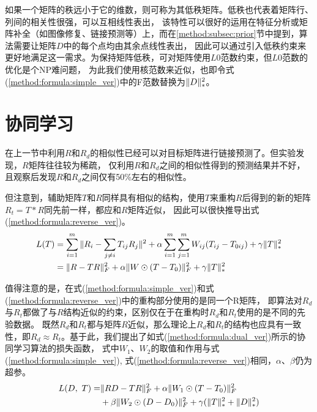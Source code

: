 如果一个矩阵的秩远小于它的维数，则可称为其低秩矩阵。低秩也代表着矩阵行、列间的相关性很强，可以互相线性表出，
该特性可以很好的运用在特征分析或矩阵补全（如图像修复、链接预测等）上，而在\ref{method:subsec:prior}节中提到，算法需要让矩阵$D$中的每个点均由其余点线性表出，
因此可以通过引入低秩约束来更好地满足这一需求。为保持矩阵低秩，可对矩阵使用$L0$范数约束，但$L0$范数的优化是个NP难问题，
为此我们使用核范数来近似，也即令式(\ref{method:formula:simple_ver})中的F范数替换为$\Arrowvert{D}\Arrowvert_*^2$。


\section{协同学习}
\label{method:sec:collaborative}
在上一节中利用$R$和$R_d$的相似性已经可以对目标矩阵进行链接预测了。但实验发现，$R$矩阵往往较为稀疏，
仅利用$R$和$R_d$之间的相似性得到的预测结果并不好，且观察后发现$R$和$R_d$之间仅有50\%左右的相似性。


但注意到，辅助矩阵$T$和$R$同样具有相似的结构，使用$T$来重构$R$后得到的新的矩阵$R_t=T*R$同先前一样，都应和$R$矩阵近似，
因此可以很快推导出式(\ref{method:formula:reverse_ver})。
\begin{align}
L(T)&=\sum_{i=1}^m\Arrowvert{R_i-\sum_{j\neq{i}} T_{ij}R_j }\Arrowvert^2 
+\alpha\sum_{i=1}^m\sum_{j=1}^mW_{ij}(T_{ij}-T_{0ij})+\gamma\Arrowvert{T}\Arrowvert_*^2 \nonumber \\
    &=\Arrowvert{R-TR}\Arrowvert_F^2+\alpha\Arrowvert{W}\odot(T-T_0)\Arrowvert_F^2+\gamma\Arrowvert{T}\Arrowvert_*^2
    \label{method:formula:reverse_ver}
\end{align}


值得注意的是，在式(\ref{method:formula:simple_ver})和式(\ref{method:formula:reverse_ver})中的重构部分使用的是同一个R矩阵，
即算法对$R_d$与$R_t$都做了与$R$结构近似的约束，区别仅在于在重构时$R_d$和$R_t$使用的是不同的先验数据。
既然$R_d$和$R_t$都与矩阵$R$近似，那么理论上$R_d$和$R_t$的结构也应具有一致性，即$R_d \approx R_t$。基于此，我们提出了如式(\ref{method:formula:dual_ver})所示的协同学习算法的损失函数，
式中$W_1$、$W_2$的取值和作用与式(\ref{method:formula:simple_ver}), 式(\ref{method:formula:reverse_ver})相同，$\alpha$、$\beta$仍为超参。
\begin{align}
L(D,\ T)=&\Arrowvert{RD-TR}\Arrowvert_F^2+\alpha\Arrowvert{W_1}\odot(T-T_0)\Arrowvert_F^2 \nonumber\\
        &+\beta\Arrowvert{W_2}\odot(D-D_0)\Arrowvert_F^2+ \gamma(\Arrowvert{T}\Arrowvert_*^2+\Arrowvert{D}\Arrowvert_*^2)
        \label{method:formula:dual_ver}
\end{align}

